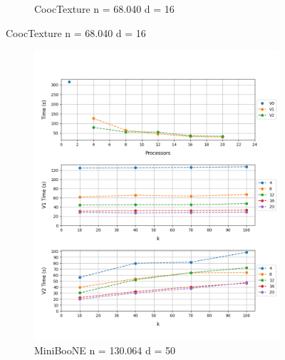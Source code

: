 \documentclass[12pt, a4paper]{article}
\begin{document}
\begin{figure}[h!]
\begin{subfigure}[b]{0.33\textwidth}
         \caption{CoocTexture n = 68.040 d = 16} 
     \end{subfigure}
\end{figure}


\begin{figure}[h!]
     \begin{subfigure}[b]{0.33\textwidth}
         \centering
         \includegraphics[height=.20\textheight, width=\textwidth, keepaspectratio]{assets/mini.png}
    \caption{MiniBooNE n = 130.064 d = 50}
     \end{subfigure}
     \hfill
     \begin{subfigure}[b]{0.33\textwidth}
         \centering

\end{subfigure}
\end{figure}
\end{document}
